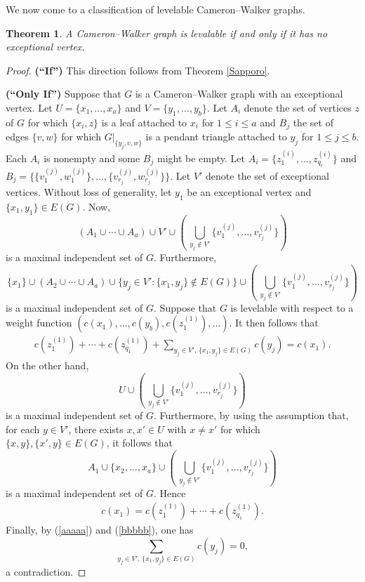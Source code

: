 \documentclass[12pt]{amsart}
\numberwithin{equation}{section}
\newtheorem{theorem}{Theorem}[section]
\theoremstyle{definition}
\newcounter{i} %
\begin{document}
We now come to a classification of levelable Cameron--Walker graphs.

\begin{theorem}
\label{theorem:CW}
A Cameron--Walker graph is levalable if and only if it has no exceptional vertex.
\end{theorem}

\begin{proof}
{\bf (``If'')}
This direction follows from Theorem \ref{Sapporo}.  

{\bf (``Only If'')}
Suppose that $G$ is a Cameron--Walker graph with an exceptional vertex.  Let $U = \{x_1, \ldots, x_a\}$ and $V = \{y_1, \ldots, y_b\}$.  Let $A_i$ denote the set of vertices $z$ of $G$ for which $\{x_i,z\}$ is a
leaf attached to $x_i$ for $1 \leq i \leq a$ and $B_j$ the set of edges $\{v,w\}$ for which $G|_{\{y_j,v,w\}}$ is a pendant triangle attached to $y_j$ for $1 \leq j \leq b$.  Each $A_i$ is nonempty and some $B_j$ might be empty.  Let $A_i = \{z_1^{(i)}, \ldots, z_{q_i}^{(i)}\}$ and $B_j = \{\{v_1^{(j)},w_1^{(j)}\}, \ldots, \{v_{r_j}^{(j)},w_{r_j}^{(j)}\}\}$.  Let $V'$ denote the set of exceptional vertices.  Without loss of generality, let $y_1$ be an exceptional vertex and $\{x_1, y_1\} \in E(G)$.  Now,
\[
(A_1 \cup \cdots \cup A_a) \cup V' \cup \left(\,\bigcup_{y_j \not\in V'}\{v_1^{(j)}, \ldots, v_{r_j}^{(j)}\}\right)
\]
is a maximal independent set of $G$.  Furthermore,
\[
\{x_1\} \cup (A_2 \cup \cdots \cup A_a) \cup \{y_j \in V': \{x_1,y_j\} \not\in E(G)\} \cup \left(\,\bigcup_{y_j \not\in V'}\{v_1^{(j)}, \ldots, v_{r_j}^{(j)}\}\right)
\]
is a maximal independent set of $G$.  Suppose that $G$ is levelable with respect to a weight function $(c(x_1), \ldots, c(y_b), c(z^{(1)}_1), \ldots)$.  It then follows that
\begin{eqnarray}
\label{aaaaa}
c(z^{(1)}_1)+\cdots+c(z^{(1)}_{q_1}) + \sum_{y_j \in V', \, \{x_1,y_j\} \in E(G)} c(y_j) = c(x_1).
\end{eqnarray}
On the other hand, 
\[
U \cup \left(\,\bigcup_{y_j \not\in V'}\{v_1^{(j)}, \ldots, v_{r_j}^{(j)}\}\right)
\]
is a maximal independent set of $G$.  Furthermore, by using the assumption that, for each $y \in V'$, there exists $x, x' \in U$ with $x \neq x'$ for which $\{x,y\}, \{x',y\} \in E(G)$, it follows that  
\[
A_1 \cup \{x_2, \ldots, x_a\} \cup \left(\,\bigcup_{y_j \not\in V'}\{v_1^{(j)}, \ldots, v_{r_j}^{(j)}\}\right)
\]
is a maximal independent set of $G$.  Hence
\begin{eqnarray}
\label{bbbbb}
c(x_1)=c(z^{(1)}_1)+\cdots+c(z^{(1)}_{q_1}).
\end{eqnarray}
Finally, by (\ref{aaaaa}) and (\ref{bbbbb}), one has
\[
\sum_{y_j \in V', \, \{x_1,y_j\} \in E(G)} c(y_j) = 0,
\]
a contradiction.  
\end{proof}
\end{document}
